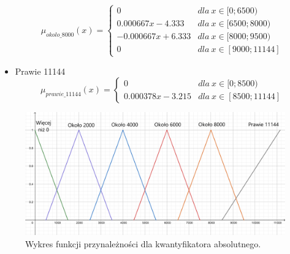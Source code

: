 \documentclass{classrep}
\begin{document}
\begin{itemize}
        \begin{equation}
            \mu_{okolo\_8000}(x) = \left\{\begin{matrix} 0 & dla \: x\in [0;6500) \\ 0.000667x - 4.333 & dla \: x\in[6500;8000) \\ -0.000667x + 6.333 & dla \: x\in [8000; 9500) \\ 0 & dla \: x\in[9000; 11144] \end{matrix}\right.
        \end{equation}
        \item Prawie 11144
        \begin{equation}
            \mu_{prawie\_11144}(x) = \left\{\begin{matrix} 0 & dla \: x\in [0;8500) \\ 0.000378x - 3.215 & dla \: x\in [8500; 11144] \end{matrix}\right.
        \end{equation}
    \end{itemize}
\begin{figure}[H]
    \centering
    \includegraphics[width=14cm]{wykres_kwantyfikator_absolutny.png}
    \caption{Wykres funkcji przynależności dla kwantyfikatora absolutnego.}
    \label{rysunek:kwantyfikator_absolutny}
\end{figure}
\end{document}
